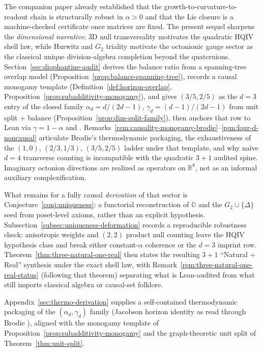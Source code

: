 \documentclass[11pt]{amsart}
\begin{document}
The companion paper \cite{hqiv-so8-paper} already established that the growth-to-curvature-to-readout chain is structurally robust in \(\alpha>0\) and that the Lie closure is a machine-checked certificate once matrices are fixed. The present sequel sharpens the \emph{dimensional narrative}: \(3\)D null transversality motivates the quadratic HQIV shell law, while Hurwitz and \(G_2\) triality motivate the octonionic gauge sector as the classical unique division-algebra completion beyond the quaternions. Section~\ref{sec:diophantine-audit} derives the balance ratio from a spanning-tree overlap model (Proposition~\ref{prop:balance-spanning-tree}), records a causal monogamy template (Definition~\ref{def:horizon-overlap}, Proposition~\ref{prop:subadditivity-monogamy}), and gives \((3/5,2/5)\) as the \(d=3\) entry of the closed family \(\alpha_d=d/(2d-1)\), \(\gamma_d=(d-1)/(2d-1)\) from unit split + balance (Proposition~\ref{prop:dim-split-family}), then anchors that row to Lean via \(\gamma=1-\alpha\) and . Remarks~\ref{rem:causality-monogamy-brodie}--\ref{rem:four-d-noncausal} articulate Brodie's thermodynamic packaging, the exhaustiveness of the \((1,0)\), \((2/3,1/3)\), \((3/5,2/5)\) ladder under that template, and why naive \(d=4\) transverse counting is incompatible with the quadratic \(3+1\) audited spine. Imaginary octonion directions are realized as operators on \(\mathbb{R}^8\), not as an informal auxiliary complexification.

What remains for a fully causal \emph{derivation} of that sector is Conjecture~\ref{conj:uniqueness}: a functorial reconstruction of \(\mathbb{O}\) and the \(G_2\cup\{\Delta\}\) seed from poset-level axioms, rather than an explicit hypothesis. Subsection~\ref{subsec:uniqueness-deformation} records a reproducible robustness check: anisotropic weights and \((2,2)\) product null counting leave the HQIV hypothesis class and break either constant-\(\alpha\) coherence or the \(d=3\) imprint row. Theorem~\ref{thm:three-natural-one-real} then states the resulting \(3{+}1\) ``Natural + Real'' synthesis under the exact shell law, with Remark~\ref{rem:three-natural-one-real-status} (following that theorem) separating what is Lean-audited from what still imports classical algebra or causal-set folklore.

Appendix~\ref{sec:thermo-derivation} supplies a self-contained thermodynamic packaging of the \((\alpha_d,\gamma_d)\) family (Jacobson horizon identity as read through Brodie \cite{brodie2026}), aligned with the monogamy template of Proposition~\ref{prop:subadditivity-monogamy} and the graph-theoretic unit split of Theorem~\ref{thm:unit-split}.
\end{document}
